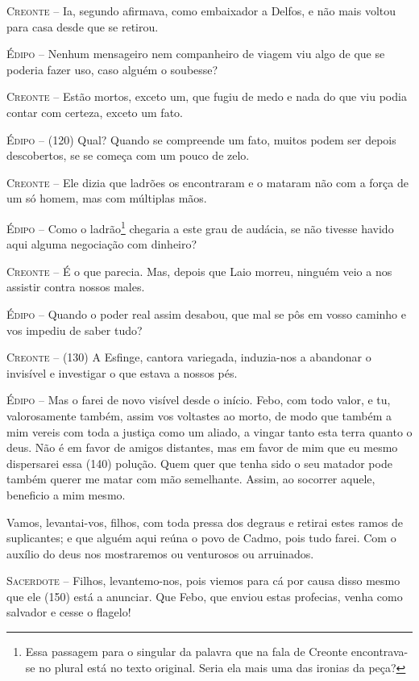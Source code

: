 \textsc{Creonte} --   Ia, segundo afirmava, como embaixador a Delfos, e não mais voltou para
casa desde que se retirou.

\textsc{Édipo} --   Nenhum mensageiro nem companheiro de viagem viu algo de que se poderia
fazer uso, caso alguém o soubesse?

\textsc{Creonte} --   Estão mortos, exceto um, que fugiu de medo e nada do que viu podia
contar com certeza, exceto um fato.

\textsc{Édipo} --   (120) Qual? Quando se compreende um fato, muitos podem ser depois
descobertos, se se começa com um pouco de zelo.

\textsc{Creonte} --   Ele dizia que ladrões os encontraram e o mataram não com a força de um
só homem, mas com múltiplas mãos.

\textsc{Édipo} --   Como o ladrão\footnote{Essa passagem para o singular da palavra que na
  fala de Creonte encontrava-se no plural está no texto original. Seria
  ela mais uma das ironias da peça?} chegaria a este grau de audácia, se
não tivesse havido aqui alguma negociação com dinheiro?

\textsc{Creonte} --   É o que parecia. Mas, depois que Laio morreu, ninguém veio a nos
assistir contra nossos males.

\textsc{Édipo} --   Quando o poder real assim desabou, que mal se pôs em vosso caminho e vos
impediu de saber tudo?

\textsc{Creonte} --   (130) A Esfinge, cantora variegada, induzia-nos a abandonar o invisível
e investigar o que estava a nossos pés.

\textsc{Édipo} --   Mas o farei de novo visível desde o início. Febo, com todo valor, e tu,
valorosamente também, assim vos voltastes ao morto, de modo que também a
mim vereis com toda a justiça como um aliado, a vingar tanto esta terra
quanto o deus. Não é em favor de amigos distantes, mas em favor de mim
que eu mesmo dispersarei essa (140) polução. Quem quer que tenha sido o
seu matador pode também querer me matar com mão semelhante. Assim, ao
socorrer aquele, beneficio a mim mesmo.

Vamos, levantai-vos, filhos, com toda pressa dos degraus e retirai estes
ramos de suplicantes; e que alguém aqui reúna o povo de Cadmo, pois tudo
farei. Com o auxílio do deus nos mostraremos ou venturosos ou
arruinados.

\textsc{Sacerdote} --   Filhos, levantemo-nos, pois viemos para cá por causa disso mesmo que ele
(150) está a anunciar. Que Febo, que enviou estas profecias, venha como
salvador e cesse o flagelo!
\bigskip

